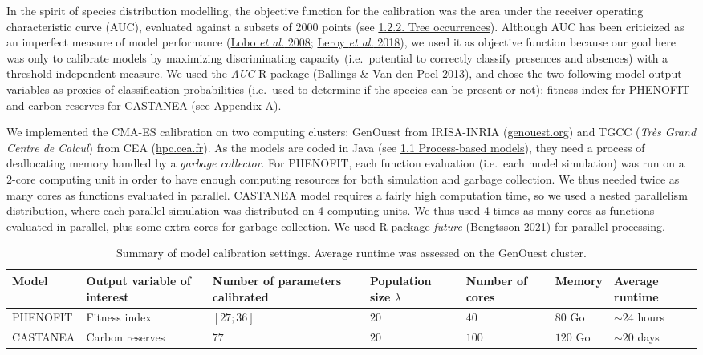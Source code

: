\documentclass[11pt,]{article}
\begin{document}
In the spirit of species distribution modelling, the objective function
for the calibration was the area under the receiver operating
characteristic curve (AUC), evaluated against a subsets of 2000 points
(see \protect\hyperlink{occurrencedata}{1.2.2. Tree occurrences}).
Although AUC has been criticized as an imperfect measure of model
performance (\protect\hyperlink{ref-Lobo2008}{Lobo \emph{et al.} 2008};
\protect\hyperlink{ref-Leroy2018}{Leroy \emph{et al.} 2018}), we used it
as objective function because our goal here was only to calibrate models
by maximizing discriminating capacity (i.e.~potential to correctly
classify presences and absences) with a threshold-independent measure.
We used the \emph{AUC} R package
(\protect\hyperlink{ref-Ballings2013}{Ballings \& Van den Poel 2013}),
and chose the two following model output variables as proxies of
classification probabilities (i.e.~used to determine if the species can
be present or not): fitness index for PHENOFIT and carbon reserves for
CASTANEA (see \protect\hyperlink{appendixA}{Appendix A}).

We implemented the CMA-ES calibration on two computing clusters:
GenOuest from IRISA-INRIA
(\href{https://www.genouest.org}{genouest.org}) and TGCC (\emph{Très
Grand Centre de Calcul}) from CEA
(\href{http://www-hpc.cea.fr/fr/complexe/tgcc.htm}{hpc.cea.fr}). As the
models are coded in Java (see \protect\hyperlink{pbmodels}{1.1
Process-based models}), they need a process of deallocating memory
handled by a \emph{garbage collector}. For PHENOFIT, each function
evaluation (i.e.~each model simulation) was run on a 2-core computing
unit in order to have enough computing resources for both simulation and
garbage collection. We thus needed twice as many cores as functions
evaluated in parallel. CASTANEA model requires a fairly high computation
time, so we used a nested parallelism distribution, where each parallel
simulation was distributed on 4 computing units. We thus used 4 times as
many cores as functions evaluated in parallel, plus some extra cores for
garbage collection. We used R package \emph{future}
(\protect\hyperlink{ref-Bengtsson2021}{Bengtsson 2021}) for parallel
processing.

\begin{table}

\caption{\label{tab:modelstable}Summary of model calibration settings. Average runtime was assessed on the GenOuest cluster.}
\centering
\begin{tabu} to 
\toprule
Model & Output variable of interest & Number of parameters calibrated & Population size $\lambda$ & Number of cores & Memory & Average runtime\\
\midrule
PHENOFIT & Fitness index & $[27;36]$ & $20$ & $40$ & $80$ Go & $\sim 24$ hours\\
\addlinespace
CASTANEA & Carbon reserves & $77$ & $20$ & $100$ & $120$ Go & $\sim 20$ days\\
\bottomrule
\end{tabu}
\end{table}
\end{document}
